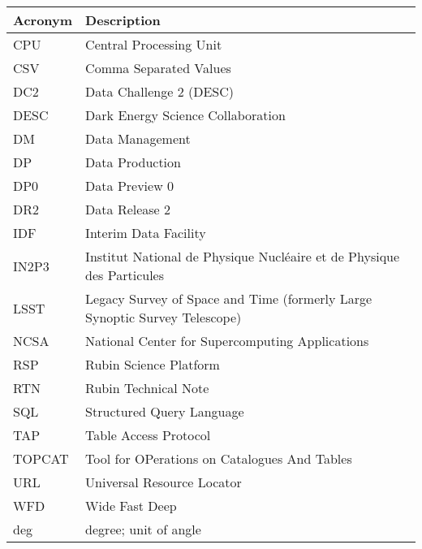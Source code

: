 \addtocounter{table}{-1}
\begin{longtable}{p{}p{}}\hline
\textbf{Acronym} & \textbf{Description}  \\\hline

CPU & Central Processing Unit \\\hline
CSV & Comma Separated Values \\\hline
DC2 & Data Challenge 2 (DESC) \\\hline
DESC & Dark Energy Science Collaboration \\\hline
DM & Data Management \\\hline
DP & Data Production \\\hline
DP0 & Data Preview 0 \\\hline
DR2 & Data Release 2 \\\hline
IDF & Interim Data Facility \\\hline
IN2P3 & Institut National de Physique Nucléaire et de Physique des Particules \\\hline
LSST & Legacy Survey of Space and Time (formerly Large Synoptic Survey Telescope) \\\hline
NCSA & National Center for Supercomputing Applications \\\hline
RSP & Rubin Science Platform \\\hline
RTN & Rubin Technical Note \\\hline
SQL & Structured Query Language \\\hline
TAP & Table Access Protocol \\\hline
TOPCAT & Tool for OPerations on Catalogues And Tables \\\hline
URL & Universal Resource Locator \\\hline
WFD & Wide Fast Deep \\\hline
deg & degree; unit of angle \\\hline
\end{longtable}
